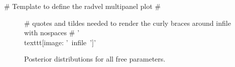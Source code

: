 {# Template to define the radvel multipanel plot #} 
\begin{figure*}[!h]
\centering
{# quotes and tildes needed to render the curly braces around infile with nospaces #}
{{'\\texttt{[image: '~infile~']}'}}
\caption{Posterior distributions for all free parameters.}
\end{figure*}

